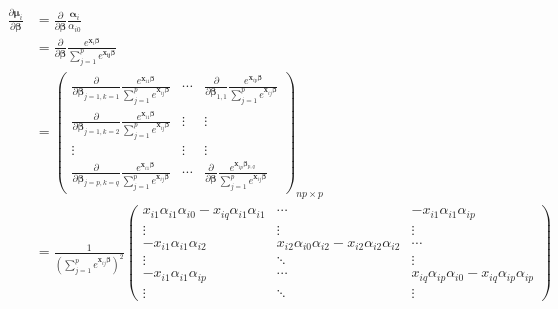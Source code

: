 \documentclass{article}
\begin{document}
\begin{align*}
  \frac{\partial  \boldsymbol\mu_i }{\partial \boldsymbol\beta} &= \frac{\partial  }{\partial \boldsymbol \beta} \frac{\boldsymbol\alpha_{i}}{\alpha_{i0}}\\
  &= \frac{\partial  }{\partial \boldsymbol \beta} \frac{e^{\mathbf{x}_i \boldsymbol\beta}}{\sum_{j = 1}^pe^{\mathbf{x_{ij}}\boldsymbol\beta}}\\
  &= \begin{pmatrix}
        \frac{\partial}{\partial \boldsymbol\beta_{j = 1, k = 1}}\frac{e^{\mathbf{x}_{i1} \boldsymbol\beta}}{\sum_{j = 1}^p e^{\mathbf{x}_{ij} \boldsymbol\beta}} & \cdots & \frac{\partial}{\partial \boldsymbol\beta_{1,1}}
        \frac{e^{\mathbf{x}_{ip} \boldsymbol\beta}}{\sum_{j = 1}^pe^{\mathbf{x}_{ij} \boldsymbol\beta}}\\
        \frac{\partial}{\partial \boldsymbol\beta_{j = 1, k = 2}}\frac{e^{\mathbf{x}_{i1} \boldsymbol\beta}}{\sum_{j = 1}^p e^{\mathbf{x}_{ij} \boldsymbol\beta}} & \vdots & \vdots \\
        \vdots & \vdots & \vdots \\
        \frac{\partial  }{\partial \boldsymbol\beta_{j = p, k = q}}\frac{e^{\mathbf{x}_{i1} \boldsymbol\beta}}{\sum_{j = 1}^pe^{\mathbf{x}_{ij} \boldsymbol\beta}} & \cdots & \frac{\partial  }{\partial \boldsymbol\beta}\frac{e^{\mathbf{x}_{ip} \boldsymbol\beta_{p,q}}}{\sum_{j = 1}^pe^{\mathbf{x}_{ij} \boldsymbol\beta}}
  \end{pmatrix}_{np \times p}\\
  &= \frac{1}{\left(\sum_{j = 1}^pe^{\mathbf{x}_{ij} \boldsymbol\beta} \right)^2} \begin{pmatrix}
x_{i1} \alpha_{i1} \alpha_{i0} - x_{iq}\alpha_{i1}\alpha_{i1} & \cdots & - x_{i1}\alpha_{i1}\alpha_{ip}\\
\vdots & \vdots & \vdots \\
- x_{i1}\alpha_{i1}\alpha_{i2} & x_{i2} \alpha_{i0}\alpha_{i2} - x_{i2}\alpha_{i2}\alpha_{i2} & \cdots \\
\vdots & \ddots & \vdots\\
- x_{i1} \alpha_{i1}\alpha_{ip} & \cdots & x_{iq}\alpha_{ip}\alpha_{i0} - x_{iq} \alpha_{ip}\alpha_{ip}\\
\vdots & \ddots & \vdots
  \end{pmatrix}\\
\end{align*}
\end{document}
